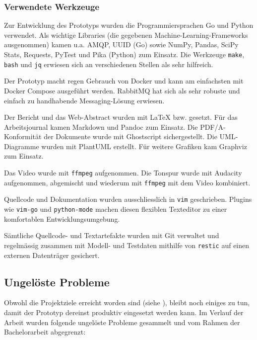 \subsubsection{Verwendete Werkzeuge}

Zur Entwicklung des Prototyps wurden die Programmiersprachen Go und Python verwendet. Als wichtige Libraries (die gegebenen Machine-Learning-Frameworks ausgenommen) kamen u.a. AMQP, UUID (Go) sowie NumPy, Pandas, SciPy Stats, Requests, PyTest und Pika (Python) zum Einsatz. Die Werkzeuge \texttt{make}, \texttt{bash} und \texttt{jq} erwiesen sich an verschiedenen Stellen als sehr hilfreich. 

Der Prototyp macht regen Gebrauch von Docker und kann am einfachsten mit Docker Compose ausgeführt werden. RabbitMQ hat sich als sehr robuste und einfach zu handhabende Messaging-Lösung erwiesen.

Der Bericht und das Web-Abstract wurden mit \LaTeX{} bzw. \XeLaTeX{} gesetzt. Für das Arbeitsjournal kamen Markdown und Pandoc zum Einsatz. Die PDF/A-Konformität der Dokumente wurde mit Ghostscript sichergestellt. Die UML-Diagramme wurden mit PlantUML erstellt. Für weitere Grafiken kam Graphviz zum Einsatz.

Das Video wurde mit \texttt{ffmpeg} aufgenommen. Die Tonspur wurde mit Audacity aufgenommen, abgemischt und wiederum mit \texttt{ffmpeg} mit dem Video kombiniert.

Quellcode und Dokumentation wurden ausschliesslich in \texttt{vim} geschrieben. Plugins wie \texttt{vim-go} und \texttt{python-mode} machen diesen flexiblen Texteditor zu einer komfortablen Entwicklungsumgebung.

Sämtliche Quellcode- und Textartefakte wurden mit Git verwaltet und regelmässig zusammen mit Modell- und Testdaten mithilfe von \texttt{restic} auf einen externen Datenträger gesichert.

\subsection{Ungelöste Probleme}
\label{sec:ungeloeste-probleme}

Obwohl die Projektziele erreicht worden sind (siehe ), bleibt noch einiges zu tun, damit der Prototyp dereinst produktiv eingesetzt werden kann. Im Verlauf der Arbeit wurden folgende ungelöste Probleme gesammelt und vom Rahmen der Bachelorarbeit abgegrenzt:


